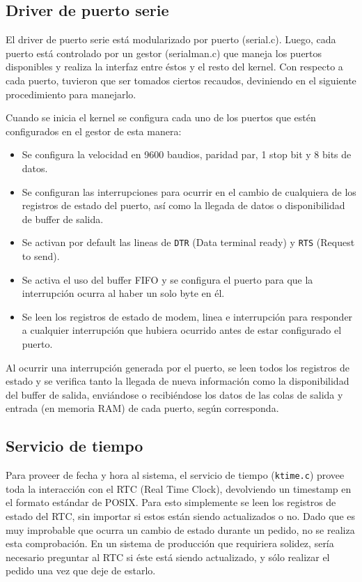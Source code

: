 \documentclass[11pt]{article}
\begin{document}
\subsection{Driver de puerto serie}

El driver de puerto serie está modularizado por puerto (serial.c). Luego, cada puerto está controlado por un gestor (serialman.c) que maneja los puertos disponibles y realiza la interfaz entre éstos y el resto del kernel.
Con respecto a cada puerto, tuvieron que ser tomados ciertos recaudos, deviniendo en el siguiente procedimiento para manejarlo.

Cuando se inicia el kernel se configura cada uno de los puertos que estén configurados en el gestor de esta manera:

\begin{itemize}
    \item Se configura la velocidad en 9600 baudios, paridad par, 1 stop bit y 8 bits de datos.
    \item Se configuran las interrupciones para ocurrir en el cambio de cualquiera de los registros de estado del puerto, así como la llegada de datos o disponibilidad de buffer de salida.
    \item Se activan por default las lineas de \texttt{DTR} (Data terminal ready) y \texttt{RTS} (Request to send).
    \item Se activa el uso del buffer FIFO y se configura el puerto para que la interrupción ocurra al haber un solo byte en él.
    \item Se leen los registros de estado de modem, linea e interrupción para responder a cualquier interrupción que hubiera ocurrido antes de estar configurado el puerto.
\end{itemize}

Al ocurrir una interrupción generada por el puerto, se leen todos los registros de estado y se verifica tanto la llegada de nueva información como la disponibilidad del buffer de salida, enviándose o recibiéndose los datos de las colas de salida y entrada (en memoria RAM) de cada puerto, según corresponda. 

\subsection{Servicio de tiempo}

Para proveer de fecha y hora al sistema, el servicio de tiempo (\texttt{ktime.c}) provee toda la interacción con el RTC (Real Time Clock), devolviendo un timestamp en el formato estándar de POSIX.
Para esto simplemente se leen los registros de estado del RTC, sin importar si estos están siendo actualizados o no. Dado que es muy improbable que ocurra un cambio de estado durante un pedido, no se realiza esta comprobación. En un sistema de producción que requiriera solidez, sería necesario preguntar al RTC si éste está siendo actualizado, y sólo realizar el pedido una vez que deje de estarlo.
\end{document}
